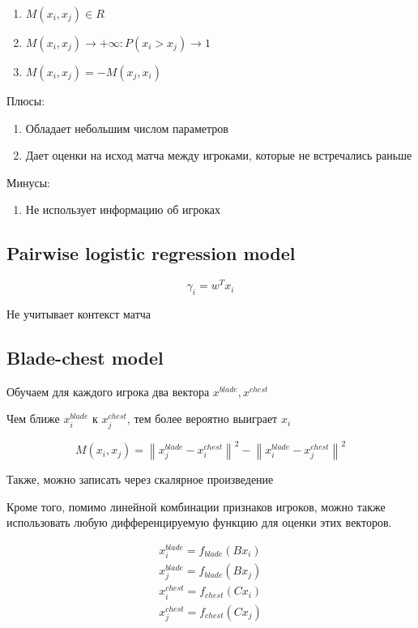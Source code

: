 \documentclass[a4paper, 12pt]{article}
\newcommand\norm[1]{\left\lVert#1\right\rVert}
\begin{document}
\begin{enumerate}
    \item $M(x_i, x_j) \in R$
    \item $M(x_i, x_j) \to +\infty: P(x_i > x_j) \to 1$
    \item $M(x_i, x_j) = -M(x_j, x_i)$
\end{enumerate}

Плюсы:

\begin{enumerate}
    \item Обладает небольшим числом параметров
    \item Дает оценки на исход матча между игроками, 
    которые не встречались раньше
\end{enumerate}

Минусы:

\begin{enumerate}
    \item Не использует информацию об игроках
\end{enumerate}

\subsection{Pairwise logistic regression model}

\[\gamma_i = w^Tx_i\]

Не учитывает контекст матча

\subsection{Blade-chest model}

Обучаем для каждого игрока два вектора $x^{blade}, x^{chest}$

Чем ближе $x_i^{blade}$ к $x_j^{chest}$, 
тем более вероятно выиграет $x_i$

\[M(x_i, x_j) = \norm{x_j^{blade} - x_i^{chest}}^2 - 
\norm{x_i^{blade} - x_j^{chest}}^2\]

Также, можно записать через скалярное произведение

Кроме того, помимо линейной комбинации признаков игроков, можно
также использовать любую дифференцируемую функцию для оценки этих векторов.

\begin{align*}
    x_i^{blade} = f_{blade}(Bx_i) \\
    x_j^{blade} = f_{blade}(Bx_j) \\
    x_i^{chest} = f_{chest}(Cx_i) \\
    x_j^{chest} = f_{chest}(Cx_j) \\
\end{align*}    
\end{document}
